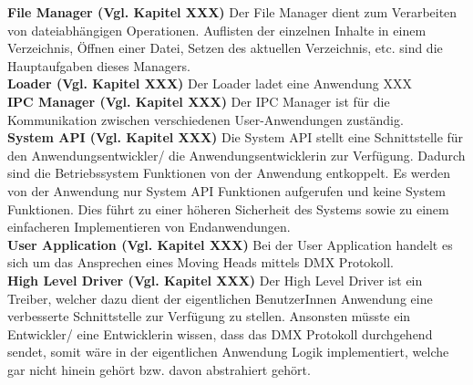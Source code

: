\textbf{File Manager (Vgl. Kapitel XXX)}
Der File Manager dient zum Verarbeiten von dateiabhängigen Operationen. Auflisten der einzelnen Inhalte in einem Verzeichnis, Öffnen einer Datei, Setzen des aktuellen Verzeichnis, etc. sind die Hauptaufgaben dieses Managers. \\

\textbf{Loader (Vgl. Kapitel XXX)}
Der Loader ladet eine Anwendung XXX \\

\textbf{IPC Manager (Vgl. Kapitel XXX)}
Der IPC Manager ist für die Kommunikation zwischen verschiedenen User-Anwendungen zuständig. \\

\textbf{System API (Vgl. Kapitel XXX)}
Die System API stellt eine Schnittstelle für den Anwendungsentwickler/ die Anwendungsentwicklerin zur Verfügung. Dadurch sind die Betriebssystem Funktionen von der Anwendung entkoppelt. Es werden von der Anwendung nur System API Funktionen aufgerufen und keine System Funktionen. Dies führt zu einer höheren Sicherheit des Systems sowie zu einem einfacheren Implementieren von Endanwendungen. \\

\textbf{User Application (Vgl. Kapitel XXX)}
Bei der User Application handelt es sich um das Ansprechen eines Moving Heads mittels DMX Protokoll. \\

\textbf{High Level Driver (Vgl. Kapitel XXX)}
Der High Level Driver ist ein Treiber, welcher dazu dient der eigentlichen BenutzerInnen Anwendung eine verbesserte Schnittstelle zur Verfügung zu stellen. Ansonsten müsste ein Entwickler/ eine Entwicklerin wissen, dass das DMX Protokoll durchgehend sendet, somit wäre in der eigentlichen Anwendung Logik implementiert, welche gar nicht hinein gehört bzw. davon abstrahiert gehört. \\

\pagebreak 